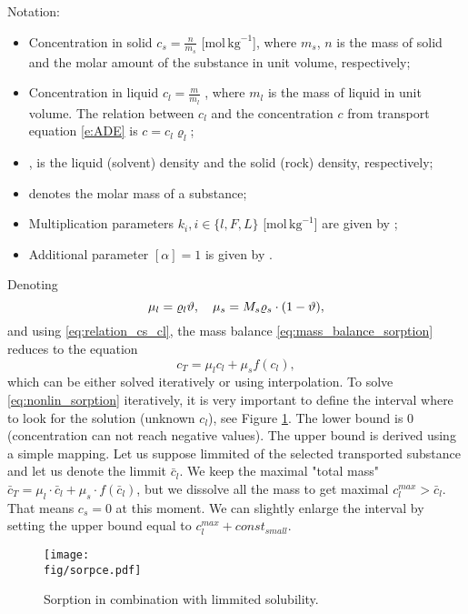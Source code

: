 Notation:
\begin{itemize}
 \item Concentration in solid $c_s = \frac{n}{m_s}$ [mol\,$\mathrm{kg}^{-1}$], where $m_s$, $n$ is the 
       mass of solid and the molar amount of the substance in unit volume, respectively;
 \item Concentration in liquid $c_l = \frac{m}{m_l}$ \units{}{}{}, where $m_l$ is 
       the mass of liquid in unit volume. The relation between $c_l$ and the concentration $c$ from 
       transport equation \eqref{e:ADE} is $c = c_l \varrho_l$;
 \item {},  is the liquid (solvent) density and the solid (rock) density, respectively;
 \item {} denotes the molar mass of a substance;
 \item Multiplication parameters $k_i, i\in\{ l,F,L\}$ [mol\,$\mathrm{kg}^{-1}$] are given by 
       ;
 \item Additional parameter $[\alpha] = 1$ is given by .
\end{itemize}

Denoting
\[ \mu_l = \varrho_l \vartheta, \quad \mu_s = M_s \varrho_s\cdot(1-\vartheta), \]
and using \eqref{eq:relation_cs_cl}, the mass balance \eqref{eq:mass_balance_sorption} reduces to the equation
\begin{equation}
 c_T = \mu_l c_l + \mu_s f(c_l),
 \label{eq:nonlin_sorption}
\end{equation}
which can be either solved iteratively or using interpolation.
To solve \eqref{eq:nonlin_sorption} iteratively, it is very important to define the interval where 
to look for the solution (unknown $c_l$), see Figure \ref{fig:sorpce}. The lower bound is $0$ (concentration can not reach negative values). 
The upper bound is derived using a simple mapping. Let us suppose limmited 
 of the selected transported substance and let us denote the 
limmit $\bar{c}_l$. We keep the maximal "total mass" 
$\bar{c}_T= \mu_l\cdot \bar{c}_l + \mu_s\cdot f(\bar{c}_l)$, but we dissolve all the mass to get 
maximal $c_l^{max} > \bar{c}_l$. That means $c_s = 0$ at this moment. We can slightly enlarge the interval by setting the upper bound equal to 
$c_l^{max} + const_{small}$.

\begin{figure}[ht!]
 \centering
 \texttt{[image: \\fig/sorpce.pdf]}
 \caption{Sorption in combination with limmited solubility.}
 \label{fig:sorpce}
\end{figure}


